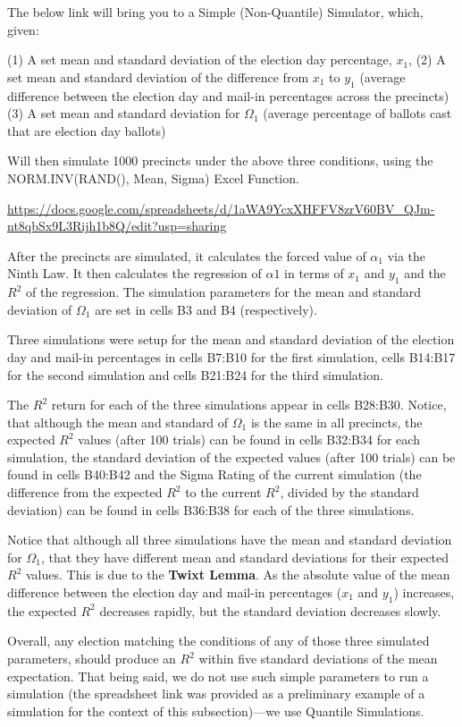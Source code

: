 The below link will bring you to a Simple (Non-Quantile) Simulator, which, given: 

(1) A set mean and standard deviation of the election day percentage, $x_{1}$, 
(2) A set mean and standard deviation of the difference from $x_{1}$ to $y_{1}$ (average difference between the election day and mail-in percentages across the precincts)
(3) A set mean and standard deviation for $\Omega_{1}$ (average percentage of ballots cast that are election day ballots)

Will then simulate 1000 precincts under the above three conditions, using the NORM.INV(RAND(), Mean, Sigma) Excel Function.

\url{https://docs.google.com/spreadsheets/d/1aWA9YcxXHFFV8zrV60BV_QJm-nt8qbSx9L3Rijh1b8Q/edit?usp=sharing}

After the precincts are simulated, it calculates the forced value of $\alpha_{1}$ via the Ninth Law. It then calculates the regression of $\alpha{1}$ in terms of $x_{1}$ and $y_{1}$ and the $R^2$ of the regression.  The simulation parameters for the mean and standard deviation of $\Omega_{1}$ are set in cells B3 and B4 (respectively).

Three simulations were setup for the mean and standard deviation of the election day and mail-in percentages in cells B7:B10 for the first simulation, cells B14:B17 for the second simulation and cells B21:B24 for the third simulation.

The $R^2$ return for each of the three simulations appear in cells B28:B30. Notice, that although the mean and standard of $\Omega_{1}$ is the same in all precincts, the expected $R^2$ values (after 100 trials) can be found in cells B32:B34 for each simulation, the standard deviation of the expected values (after 100 trials) can be found in cells B40:B42 and the Sigma Rating of the current simulation (the difference from the expected $R^2$ to the current $R^2$, divided by the standard deviation) can be found in cells B36:B38 for each of the three simulations.

Notice that although all three simulations have the mean and standard deviation for $\Omega_{1}$, that they have different mean and standard deviations for their expected $R^2$ values. This is due to the \textbf{Twixt Lemma}. As the absolute value of the mean difference between the election day and mail-in percentages ($x_{1}$ and $y_{1}$) increases, the expected $R^2$ decreases rapidly, but the standard deviation decreases slowly.

Overall, any election matching the conditions of any of those three simulated parameters, should produce an $R^2$ within five standard deviations of the mean expectation. 
\newpage
That being said, we do not use such simple parameters to run a simulation (the spreadsheet link was provided as a preliminary example of a simulation for the context of this subsection)---we use Quantile Simulations.

